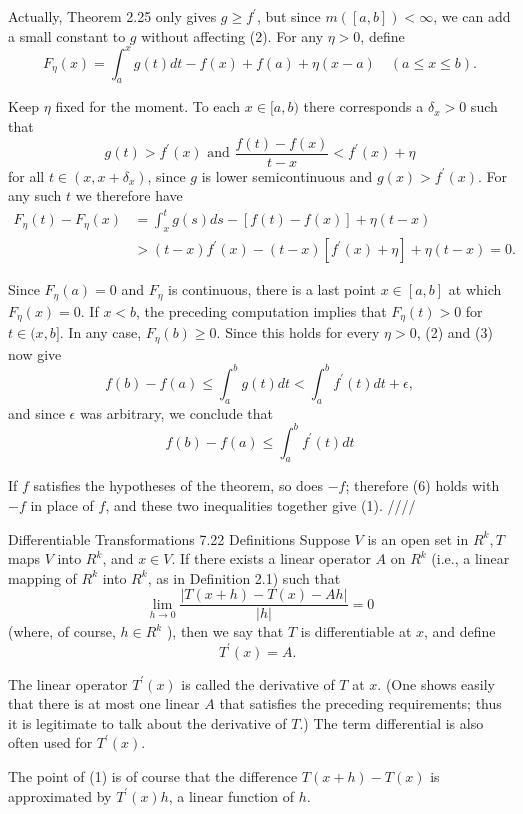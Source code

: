 Actually, Theorem 2.25 only gives $g \geq f^{\prime}$, but since $m([a, b])<\infty$, we can add a small constant to $g$ without affecting (2). For any $\eta>0$, define
$$
F_\eta(x)=\int_a^x g(t) d t-f(x)+f(a)+\eta(x-a) \quad(a \leq x \leq b) .
$$

Keep $\eta$ fixed for the moment. To each $x \in[a, b)$ there corresponds a $\delta_x>0$ such that
$$
g(t)>f^{\prime}(x) \text { and } \frac{f(t)-f(x)}{t-x}<f^{\prime}(x)+\eta
$$
for all $t \in\left(x, x+\delta_x\right)$, since $g$ is lower semicontinuous and $g(x)>f^{\prime}(x)$. For any such $t$ we therefore have
$$
\begin{aligned}
F_\eta(t)-F_\eta(x) & =\int_x^t g(s) d s-[f(t)-f(x)]+\eta(t-x) \\
& >(t-x) f^{\prime}(x)-(t-x)\left[f^{\prime}(x)+\eta\right]+\eta(t-x)=0 .
\end{aligned}
$$

Since $F_\eta(a)=0$ and $F_\eta$ is continuous, there is a last point $x \in[a, b]$ at which $F_\eta(x)=0$. If $x<b$, the preceding computation implies that $F_\eta(t)>0$ for $t \in(x, b]$. In any case, $F_\eta(b) \geq 0$. Since this holds for every $\eta>0$, (2) and (3) now give
$$
f(b)-f(a) \leq \int_a^b g(t) d t<\int_a^b f^{\prime}(t) d t+\epsilon,
$$
and since $\epsilon$ was arbitrary, we conclude that
$$
f(b)-f(a) \leq \int_a^b f^{\prime}(t) d t
$$

If $f$ satisfies the hypotheses of the theorem, so does $-f$; therefore (6) holds with $-f$ in place of $f$, and these two inequalities together give (1). ////

Differentiable Transformations
7.22 Definitions Suppose $V$ is an open set in $R^k, T$ maps $V$ into $R^k$, and $x \in V$. If there exists a linear operator $A$ on $R^k$ (i.e., a linear mapping of $R^k$ into $R^k$, as in Definition 2.1) such that
$$
\lim _{h \rightarrow 0} \frac{|T(x+h)-T(x)-A h|}{|h|}=0
$$
(where, of course, $h \in R^k$ ), then we say that $T$ is differentiable at $x$, and define
$$
T^{\prime}(x)=A \text {. }
$$

The linear operator $T^{\prime}(x)$ is called the derivative of $T$ at $x$. (One shows easily that there is at most one linear $A$ that satisfies the preceding requirements; thus it is legitimate to talk about the derivative of $T$.) The term differential is also often used for $T^{\prime}(x)$.

The point of (1) is of course that the difference $T(x+h)-T(x)$ is approximated by $T^{\prime}(x) h$, a linear function of $h$.

